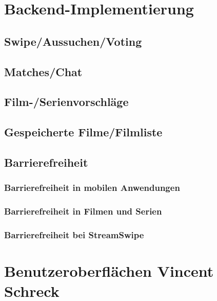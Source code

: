 \documentclass[11pt,a4paper]{article}
\begin{document}
\section{Backend-Implementierung}


\subsection{Swipe/Aussuchen/Voting}		
\subsection{Matches/Chat}		
\subsection{Film-/Serienvorschläge}
\subsection{Gespeicherte Filme/Filmliste}		

\subsection{Barrierefreiheit}
\label{sec:barrierefreiheit}


\subsubsection{Barrierefreiheit in mobilen Anwendungen}


\subsubsection{Barrierefreiheit in Filmen und Serien}


\subsubsection{Barrierefreiheit bei StreamSwipe}
\label{sec:bf-streamswipe}



\section[Benutzeroberflächen]{Benutzeroberflächen \hfill \normalfont \small{Vincent Schreck}}

\end{document}
